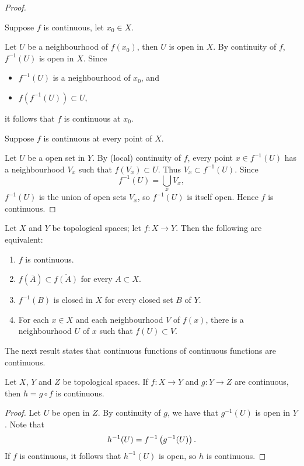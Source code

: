 \begin{proof} \

\fbox{$\implies$} Suppose $f$ is continuous, let $x_0\in X$. 

Let $U$ be a neighbourhood of $f(x_0)$, then $U$ is open in $X$. By continuity of $f$, $f^{-1}(U)$ is open in $X$. Since
\begin{itemize}
\item $f^{-1}(U)$ is a neighbourhood of $x_0$, and
\item $f(f^{-1}(U))\subset U$,
\end{itemize}
it follows that $f$ is continuous at $x_0$.

\fbox{$\impliedby$} Suppose $f$ is continuous at every point of $X$.

Let $U$ be a open set in $Y$. By (local) continuity of $f$, every point $x\in f^{-1}(U)$ has a neighbourhood $V_x$ such that $f(V_x)\subset U$. Thus $V_x\subset f^{-1}(U)$. Since
\[f^{-1}(U)=\bigcup_{x}V_x,\]
$f^{-1}(U)$ is the union of open sets $V_x$, so $f^{-1}(U)$ is itself open. Hence $f$ is continuous.
\end{proof}

\begin{lemma}
Let $X$ and $Y$ be topological spaces; let $f\colon X\to Y$. Then the following are equivalent:
\begin{enumerate}[label=(\roman*)]
\item $f$ is continuous.
\item $f(\overline{A})\subset \overline{f(A)}$ for every $A\subset X$.
\item $f^{-1}(B)$ is closed in $X$ for every closed set $B$ of $Y$.
\item For each $x\in X$ and each neighbourhood $V$ of $f(x)$, there is a neighbourhood $U$ of $x$ such that $f(U)\subset V$.
\end{enumerate}
\end{lemma}

The next result states that continuous functions of continuous functions are continuous.

\begin{lemma}
Let $X$, $Y$ and $Z$ be topological spaces. If $f\colon X\to Y$ and $g\colon Y\to Z$ are continuous, then $h=g\circ f$ is continuous.
\end{lemma}

\begin{proof}
Let $U$ be open in $Z$. By continuity of $g$, we have that $g^{-1}(U)$ is open in $Y$. Note that
\[h^{-1}(U)=f^{-1}\left(g^{-1}(U)\right).\]
If $f$ is continuous, it follows that $h^{-1}(U)$ is open, so $h$ is continuous.
\end{proof}

